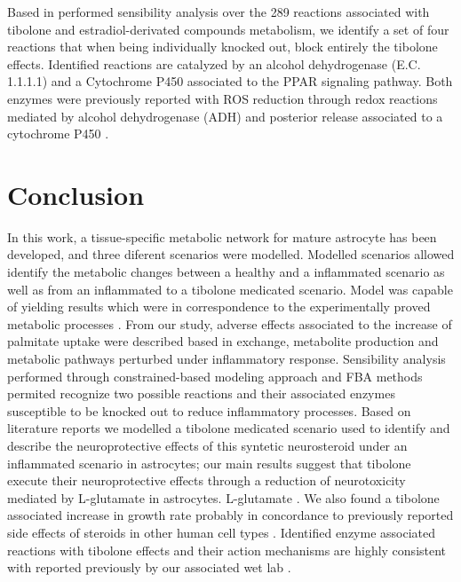 Based in performed sensibility analysis over the 289 reactions associated with tibolone and estradiol-derivated compounds metabolism, we identify a set of four reactions that when being individually knocked out, block entirely the tibolone effects. Identified reactions are catalyzed by an alcohol dehydrogenase (E.C. 1.1.1.1) and a Cytochrome P450 associated to the PPAR signaling pathway. Both enzymes were previously reported with ROS reduction through redox reactions mediated by alcohol dehydrogenase (ADH) and posterior release associated to a cytochrome P450 \cite{Pessayre2001, Sun2009}. 

\section{Conclusion}
In this work, a tissue-specific metabolic network for mature astrocyte has been developed, and three diferent scenarios were modelled. Modelled scenarios allowed identify the metabolic changes between a healthy and a inflammated scenario as well as from an inflammated to a tibolone medicated scenario. Model was capable of yielding results which were in correspondence to the experimentally proved metabolic processes \cite{Das2010,Liu2013}. From our study, adverse effects associated to the increase of palmitate uptake were described based in exchange, metabolite production and metabolic pathways perturbed under inflammatory response. Sensibility analysis performed through constrained-based modeling approach and FBA methods permited recognize two possible reactions and their associated enzymes susceptible to be knocked out to reduce inflammatory processes. Based on literature reports we modelled a tibolone medicated scenario used to identify and describe the neuroprotective effects of this syntetic neurosteroid under an inflammated scenario in astrocytes; our main results suggest that tibolone execute their neuroprotective effects through a reduction of neurotoxicity mediated by L-glutamate in astrocytes. L-glutamate \cite{Petrelli2016}. We also found a tibolone associated increase in growth rate probably in concordance to previously reported side effects of steroids in other human cell types \cite{Colditz1993,Colditz1995}. Identified enzyme associated reactions with tibolone effects and their action mechanisms are highly consistent with reported previously by our associated wet lab \cite{Avila-Rodriguez2014, Avila-Rodriguez2016}. 